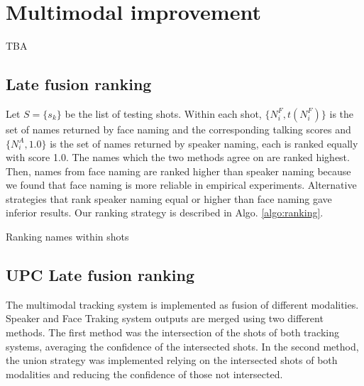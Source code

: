 \section{Multimodal improvement}
\label{sec:naming}

TBA

\subsection{Late fusion ranking}

Let $S = \{s_k\}$ be the list of testing shots. Within each shot, $\{N^F_i, t(N^F_i)\}$ is the set of names returned by face naming and the corresponding talking scores and $\{N^A_i, 1.0\}$  is the set of names returned by speaker naming, each is ranked equally with score 1.0.
%
The names which the two methods agree on are ranked highest. 
%
Then, names from face naming are ranked higher than speaker naming  because we found that face naming is more reliable in empirical experiments.
%
Alternative strategies that rank speaker naming equal or higher than face naming gave inferior results.
%
Our ranking strategy is described in Algo. \ref{algo:ranking}. 

\begin{algorithm}
  \caption{Ranking names within shots
    \label{algo:ranking}}
  \begin{algorithmic}[1]
					\Else
					\EndIf
				\EndFor
					\EndIf
				\EndFor
		\EndFor
  \end{algorithmic}
\end{algorithm}
%

\subsection{UPC Late fusion ranking}

The multimodal tracking system is implemented as fusion of different modalities. Speaker and Face Traking system outputs are merged using two different methods. The first method was the intersection of the shots of both tracking systems, averaging the confidence of the intersected shots. In the second method, the union strategy  was implemented relying on the intersected shots of both modalities and reducing the confidence of those not intersected.

